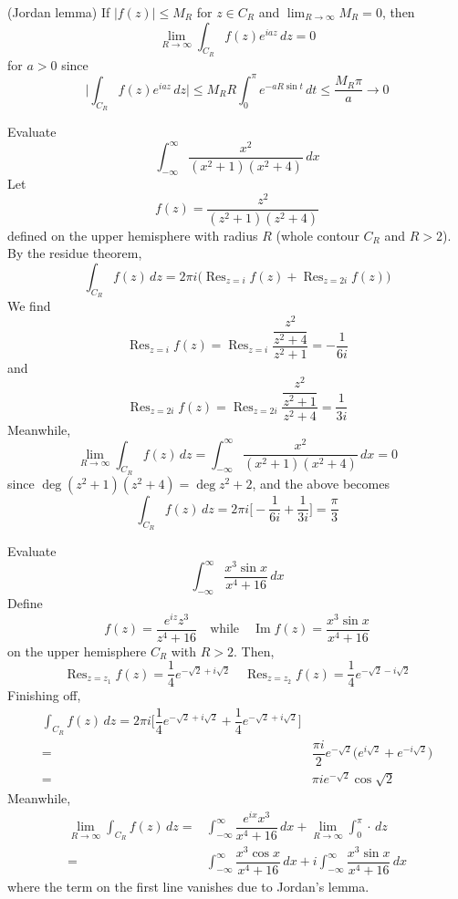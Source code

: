 \vspace{2ex}
\begin{thm}
(Jordan lemma) If $|f(z)|\leq M_{R}$ for $z\in C_{R}$ and $\lim _{R\rightarrow \infty }M_{R}=0$, then
\[\lim _{R\rightarrow \infty }\int _{C_{R}}f(z)e^{iaz}\,dz=0\]
for $a>0$ since
\[\Big|\int _{C_{R}}f(z)e^{iaz}\,dz\Big|\leq M_{R}R\int ^{\pi }_{0}e^{-aR\sin t}\,dt\leq \dfrac{M_{R}\pi }{a}\rightarrow 0\]
\end{thm}
\vspace{2ex}
\begin{ex}
Evaluate 
\[\int ^{\infty }_{-\infty }\dfrac{x^2}{(x^2+1)(x^2+4)}\,dx\]
Let
\[f(z)=\dfrac{z^2}{(z^2+1)(z^2+4)}\]
defined on the upper hemisphere with radius $R$ (whole contour $C_{R}$ and $R>2$). By the residue theorem,
\[\int _{C_{R}}f(z)\,dz=2\pi i\Big(\mathop{\mathrm{Res}}_{z=i}f(z)+\mathop{\mathrm{Res}}_{z=2i}f(z)\Big)\]
We find
\[\mathop{\mathrm{Res}}_{z=i}f(z)=\mathop{\mathrm{Res}}_{z=i}\dfrac{\dfrac{z^2}{z^2+4}}{z^2+1}=-\dfrac{1}{6i}\]
and
\[\mathop{\mathrm{Res}}_{z=2i}f(z)=\mathop{\mathrm{Res}}_{z=2i}\dfrac{\dfrac{z^2}{z^2+1}}{z^2+4}=\dfrac{1}{3i}\]
Meanwhile,
\[\lim_{R\rightarrow \infty }\int_{C_{R}}f(z)\,dz=\int ^{\infty }_{-\infty }\dfrac{x^2}{(x^2+1)(x^2+4)}\,dx=0\]
since $\mathop{\mathrm{deg}}(z^2+1)(z^2+4)=\mathop{\mathrm{deg}}z^2+2$, and the above becomes
\[\int _{C_{R}}f(z)\,dz=2\pi i\Big[-\dfrac{1}{6i}+\dfrac{1}{3i}\Big]=\dfrac{\pi }{3}\]
\end{ex}
\vspace{2ex}
\begin{ex}
Evaluate
\[\int ^{\infty }_{-\infty }\dfrac{x^3\sin x}{x^{4}+16}\,dx\]
Define
\[f(z)=\dfrac{e^{iz}z^3}{z^{4}+16}\quad \mathrm{while}\quad \mathop{\mathrm{Im}}f(z)=\dfrac{x^3\sin x}{x^{4}+16}\]
on the upper hemisphere $C_{R}$ with $R>2$. Then,
\[\mathop{\mathrm{Res}}_{z=z_1}f(z)=\dfrac{1}{4}e^{-\sqrt{2}+i\sqrt{2}}\quad \mathop{\mathrm{Res}}_{z=z_2}f(z)=\dfrac{1}{4}e^{-\sqrt{2}-i\sqrt{2}}\]
Finishing off,
\begin{align*}
\int _{C_{R}}f(z)\,dz=2\pi i\Big[\dfrac{1}{4}e^{-\sqrt{2}+i\sqrt{2}}+\dfrac{1}{4}e^{-\sqrt{2}+i\sqrt{2}}\Big]\\
=&\dfrac{\pi i}{2}e^{-\sqrt{2}}\Big(e^{i\sqrt{2}}+e^{-i\sqrt{2}}\Big)\\
=&\pi ie^{-\sqrt{2}}\cos \sqrt{2}
\end{align*}
Meanwhile, 
\begin{align*}
\lim _{R\rightarrow \infty }\int _{C_{R}}f(z)\,dz=&\int ^{\infty }_{-\infty }\dfrac{e^{ix}x^3}{x^{4}+16}\,dx+\lim _{R\rightarrow \infty }\int ^{\pi }_{0}\cdot \,dz\\
=&\int ^{\infty }_{-\infty }\dfrac{x^3\cos x}{x^{4}+16}\,dx+i\int ^{\infty }_{-\infty }\dfrac{x^{3}\sin x}{x^{4}+16}\,dx
\end{align*}
where the term on the first line vanishes due to Jordan's lemma.
\end{ex}
